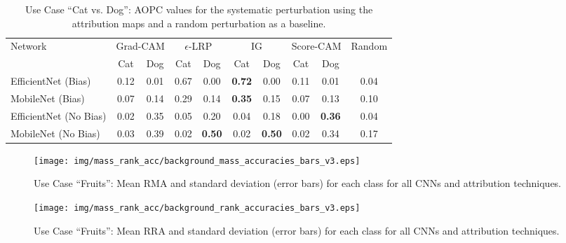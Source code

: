 \documentclass[runningheads]{llncs}
\begin{document}
\begin{table}[t]
\begin{center}
\caption{Use Case \enquote{Cat vs. Dog}: AOPC values for the systematic perturbation using the attribution maps and a random perturbation as a baseline.}
\begin{tabular}{l|| cc | cc | cc | cc | c}
     \multirow{2}{*}{Network}
     & \multicolumn{2}{c|}{Grad-CAM} & \multicolumn{2}{c|}{$\epsilon$-LRP} & \multicolumn{2}{c|}{IG}  & \multicolumn{2}{c|}{Score-CAM} & \multirow{2}{*}{Random} \\ \cline{2-9}
                   & Cat & Dog & Cat & Dog & Cat & Dog & Cat & Dog &  \\  \hline \hline
      EfficientNet (Bias) & 0.12  & 0.01 & 0.67  & 0.00 & \textbf{0.72}  & 0.00 & 0.11  & 0.01 & 0.04 \\
      MobileNet (Bias) & 0.07  & 0.14 & 0.29  & 0.14 & \textbf{0.35}  & 0.15 & 0.07  & 0.13 & 0.10 \\ \hline
       EfficientNet (No Bias)& 0.02  & 0.35 & 0.05  & 0.20 & 0.04  & 0.18 & 0.00  & \textbf{0.36} & 0.04 \\
       MobileNet (No Bias) & 0.03  & 0.39 & 0.02  & \textbf{0.50} & 0.02  & \textbf{0.50} & 0.02  & 0.34 & 0.17 \\
     \hline
\end{tabular}
\label{tab:aopc-catdog}
\vspace{-6mm}
\end{center}
\end{table}

\begin{figure}[t]
    \centering
    \texttt{[image: img/mass\_rank\_acc/background\_mass\_accuracies\_bars\_v3.eps]}
        \caption{Use Case \enquote{Fruits}: Mean RMA and standard deviation (error bars) for each class for all CNNs and attribution techniques.}
    \label{fig:mass-accuracy-background}
    \vspace{-4mm}
\end{figure}

\begin{figure}[t]
    \centering
    \texttt{[image: img/mass\_rank\_acc/background\_rank\_accuracies\_bars\_v3.eps]}
    \caption{Use Case \enquote{Fruits}: Mean RRA and standard deviation (error bars) for each class for all CNNs and attribution techniques.}
    \label{fig:rank-accuracy-background}
    \vspace{-4mm}
\end{figure}
\end{document}
